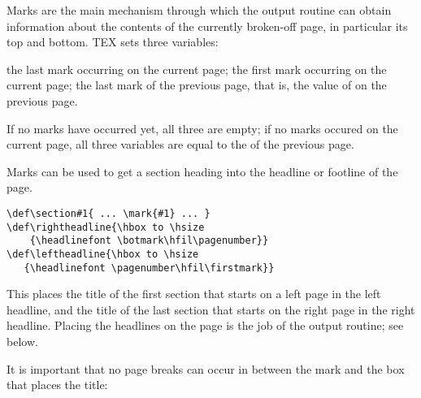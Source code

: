 Marks are the main mechanism through which the output routine can obtain information
about the contents of the currently broken-off page, in particular its top and bottom. TEX sets
three variables:

{\obeylines
{} the last mark occurring on the current page;
 the first mark occurring on the current page;
 the last mark of the previous page, that is, the value of  on the previous
page.
}



If no marks have occurred yet, all three are empty; if no marks occured on the current page, all three variables are equal to the  of the previous page. 

Marks can be used to get a section heading into the headline or footline of the page.

\begin{verbatim}
\def\section#1{ ... \mark{#1} ... }
\def\rightheadline{\hbox to \hsize
    {\headlinefont \botmark\hfil\pagenumber}}
\def\leftheadline{\hbox to \hsize
   {\headlinefont \pagenumber\hfil\firstmark}}
\end{verbatim}

This places the title of the first section that starts on a left page in the left
headline, and the title of the last section that starts on the right page in
the right headline. Placing the headlines on the page is the job of the output
routine; see below.

It is important that no page breaks can occur in between the mark and the
box that places the title:

\begin{teXXX}
\def\section#1{ ...
   \penalty\beforesectionpenalty
   \mark{#1}
   \hbox{ ... #1 ...}
   \nobreak
   \vskip\aftersectionskip
   \noindent}
\end{teXXX}

\newdimen\theight 
\def \TeXref#1{%
             \vadjust{\setbox0=\hbox{\sevenrm\quad\quad\TeX book: #1}%
             \theight=\ht0 
             \advance\theight by \dp0    \advance\theight by \lineskip 
             \kern -\theight \vbox to \theight{\rightline{\rlap{\box0}}%
             \vss}%
             }}%
 
